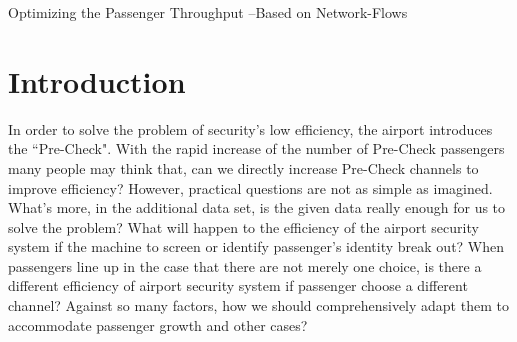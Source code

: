 \documentclass[12pt]{article}
\begin{document}
\begin{center}
{\Large Optimizing the Passenger Throughput --Based on Network-Flows }
\end{center}


\begin{abstract}
\setlength{\parindent}{0pt} \setlength{\parskip}{1.5ex plus 0.5ex
minus 0.2ex}
For the airport management, it is a real-life common phenomenon to save passengers' time as far as possible. An appropriately example is that sometimes passengers who arrive airport later may not board the flight because of the low efficiency of checkpoints. Therefore we need a model to test and discover the bottlenecks of airport checkpoint efficiency and propose the existing system a number of feasible modifications to improve efficiency. Our model for this problem is the Network-Flows. Applying the Edmonds-Karp algorithm, we obtain the maximum efficiency of the airport security system proportional to the efficiency through making the network traffic and airport security system. And then observe the modified maximum traffic of the network changes after modifying some of the parameters of the network. If some big changes have occurred， it is indicated that this part is more likely to affect the airport security efficiency bottlenecks. After that, we can try to make some modifications to the network without changing its basic parameters so that the maximum traffic is larger than before. So we can identify potential, feasible and excellent programs using the mapping relation between the network and airport security system. Finally, we consider comprehensive factors to evaluate the modified program's merits and drawbacks.
\end{abstract}

\tableofcontents

\clearpage
\setlength{\parindent}{2em}
\section{Introduction}


In order to solve the problem of security's low efficiency, the airport introduces the ``Pre-Check". With the rapid increase of the number of Pre-Check passengers many people may think that, can we directly increase Pre-Check channels to improve efficiency? However, practical questions are not as simple as imagined. What's more, in the additional data set, is the given data really enough for us to solve the problem? What will happen to the efficiency of the airport security system if the machine to screen or identify passenger's identity break out? When passengers line up in the case that there are not merely one choice, is there a different efficiency of airport security system if passenger choose a different channel? Against so many factors, how we should comprehensively adapt them to accommodate passenger growth and other cases?
\end{document}
